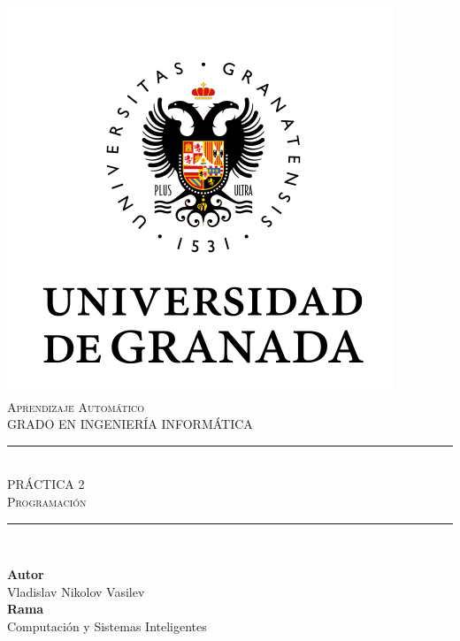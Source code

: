 \documentclass[11pt,a4paper]{article}
\begin{document}

\begin{titlepage}

\begin{minipage}{\textwidth}

\centering

\includegraphics[scale=0.5]{img/ugr.png}\\

\textsc{\Large Aprendizaje Automático\\[0.2cm]}
\textsc{GRADO EN INGENIERÍA INFORMÁTICA}\\[1cm]

\noindent\rule[-1ex]{\textwidth}{1pt}\\[1.5ex]
\textsc{{\Huge PRÁCTICA 2\\[0.5ex]}}
\textsc{{\Large Programación\\}}
\noindent\rule[-1ex]{\textwidth}{2pt}\\[3.5ex]

\end{minipage}

\vspace{0.5cm}

\begin{minipage}{\textwidth}

\centering

\textbf{Autor}\\ {Vladislav Nikolov Vasilev}\\[2.5ex]
\textbf{Rama}\\ {Computación y Sistemas Inteligentes}\\[2.5ex]
\vspace{0.3cm}


\end{minipage}
\end{titlepage}
\end{document}
